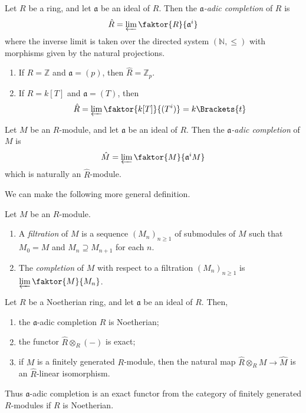 \begin{definition}
    Let \( R \) be a ring, and let \( \mathfrak a \) be an ideal of \( R \).
    Then the \emph{\( \mathfrak a \)-adic completion} of \( R \) is
    \[ \hat R = \varprojlim \faktor{R}{\mathfrak a^i} \]
    where the inverse limit is taken over the directed system \( (\mathbb N, \leq) \) with morphisms given by the natural projections.
\end{definition}
\begin{example}
    \begin{enumerate}
        \item If \( R = \mathbb Z \) and \( \mathfrak a = (p) \), then \( \hat R = \mathbb Z_p \).
        \item If \( R = k[T] \) and \( \mathfrak a = (T) \), then
        \[ \hat R = \varprojlim \faktor{k[T]}{(T^i)} = k\Brackets{t} \]
    \end{enumerate}
\end{example}
\begin{definition}
    Let \( M \) be an \( R \)-module, and let \( \mathfrak a \) be an ideal of \( R \).
    Then the \emph{\( \mathfrak a \)-adic completion} of \( M \) is
    \[ \hat M = \varprojlim \faktor{M}{\mathfrak a^i M} \]
    which is naturally an \( \hat R \)-module.
\end{definition}
We can make the following more general definition.
\begin{definition}
    Let \( M \) be an \( R \)-module.
    \begin{enumerate}
        \item A \emph{filtration} of \( M \) is a sequence \( (M_n)_{n \geq 1} \) of submodules of \( M \) such that \( M_0 = M \) and \( M_n \supseteq M_{n+1} \) for each \( n \).
        \item The \emph{completion} of \( M \) with respect to a filtration \( (M_n)_{n \geq 1} \) is \( \varprojlim \faktor{M}{M_n} \).
    \end{enumerate}
\end{definition}
\begin{theorem}
    Let \( R \) be a Noetherian ring, and let \( \mathfrak a \) be an ideal of \( R \).
    Then,
    \begin{enumerate}
        \item the \( \mathfrak a \)-adic completion \( \hat R \) is Noetherian;
        \item the functor \( \hat R \otimes_R (-) \) is exact;
        \item if \( M \) is a finitely generated \( R \)-module, then the natural map \( \hat R \otimes_R M \to \hat M \) is an \( \hat R \)-linear isomorphism.
    \end{enumerate}
\end{theorem}
Thus \( \mathfrak a \)-adic completion is an exact functor from the category of finitely generated \( R \)-modules if \( R \) is Noetherian.


